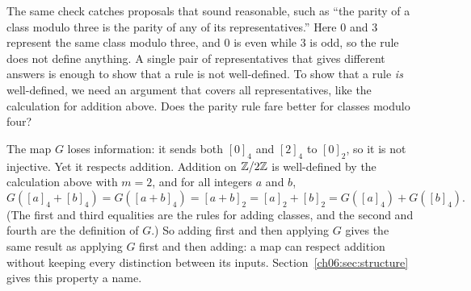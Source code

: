 The same check catches proposals that sound reasonable, such as ``the parity of a class modulo three is the parity of any of its representatives.'' Here $0$ and $3$ represent the same class modulo three, and $0$ is even while $3$ is odd, so the rule does not define anything. A single pair of representatives that gives different answers is enough to show that a rule is not well-defined. To show that a rule \emph{is} well-defined, we need an argument that covers all representatives, like the calculation for addition above. Does the parity rule fare better for classes modulo four?


The map $G$ loses information: it sends both $[0]_4$ and $[2]_4$ to $[0]_2$, so it is not injective. Yet it respects addition. Addition on $\mathbb Z/2\mathbb Z$ is well-defined by the calculation above with $m=2$, and for all integers $a$ and $b$,
\[
G([a]_4+[b]_4)=G([a+b]_4)=[a+b]_2=[a]_2+[b]_2=G([a]_4)+G([b]_4).
\]
(The first and third equalities are the rules for adding classes, and the second and fourth are the definition of $G$.) So adding first and then applying $G$ gives the same result as applying $G$ first and then adding: a map can respect addition without keeping every distinction between its inputs. Section~\ref{ch06:sec:structure} gives this property a name.
